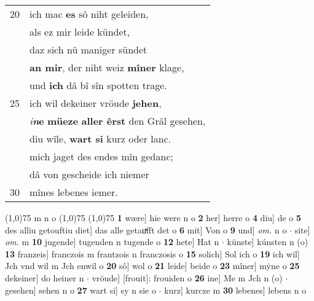 \documentclass[8pt,a4paper,notitlepage]{article}
\begin{document}
\begin{table}[ht]
\begin{minipage}[t]{0.5\linewidth}
\begin{tabular}{rl}
20 & ich mac \textbf{es} sô niht geleiden,\\ 
 & als ez mir leide kündet,\\ 
 & daz sich nû maniger sündet\\ 
 & \textbf{an mir}, der niht weiz \textbf{mîner} klage,\\ 
 & und \textbf{ich} dâ bî sîn spotten trage.\\ 
25 & ich wil dekeiner vröude \textbf{jehen},\\ 
 & \textit{i}\textbf{\textit{n}e} \textbf{müeze} \textbf{aller êrst} den Grâl gesehen,\\ 
 & diu wîle, \textbf{wart si} kurz oder lanc.\\ 
 & mich jaget des endes mîn gedanc;\\ 
 & dâ von gescheide ich niemer\\ 
30 & mînes lebenes iemer.\\ 
\end{tabular}
\scriptsize
\line(1,0){75} \newline
m n o \newline
\line(1,0){75} \newline
\newline
\line(1,0){75} \newline
\textbf{1} wære] hie were n o \textbf{2} her] herre o \textbf{4} diu] de o \textbf{5} des alliu getouftiu diet] das alle getauͯfft det o \textbf{6} mit] Von o \textbf{9} und] \textit{om.} n o  $\cdot$ site] \textit{om.} m \textbf{10} jugende] tugenden n tugende o \textbf{12} hete] Hat n  $\cdot$ künste] kúnsten n (o) \textbf{13} franzeis] franczois m frantzois n franczosis o \textbf{15} solich] Sol ich o \textbf{19} ich wil] Jch vnd wil m Jch enwil o \textbf{20} sô] wol o \textbf{21} leide] beide o \textbf{23} mîner] mẏne o \textbf{25} dekeiner] do heiner n  $\cdot$ vröude] [frouit]: frouiden o \textbf{26} ine] Me m Jch n (o)  $\cdot$ gesehen] sehen n o \textbf{27} wart si] sy n sie o  $\cdot$ kurz] kurcze m \textbf{30} lebenes] lebens n o \newline
\end{minipage}
\end{table}
\newpage
\end{document}
